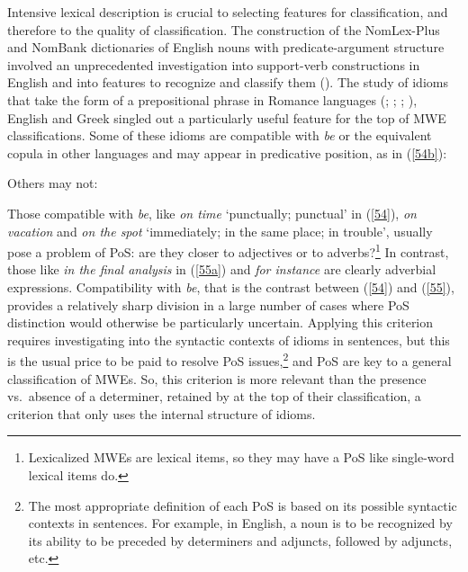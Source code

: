 \documentclass[output=paper]{langsci/langscibook}
\begin{document}
Intensive lexical description is crucial to selecting features for classification, and therefore to the quality of classification. The construction of the NomLex-Plus and NomBank dictionaries of English nouns with predicate-argument structure involved an unprecedented investigation into support-verb constructions in English and into features to recognize and classify them (\citealt{Meyers2007}). The study of idioms that take the form of a prepositional phrase in Romance languages (\citealt{Danlos1980}; \citealt{Ranchhod1990}; \citealt{gross1996}; \citealt{Vietri1996}),  English \citep{Machonis1988} and  Greek \citep{Moustaki1995} singled out a particularly useful feature for the top of MWE classifications. Some of these idioms are compatible with \textit{be} or the equivalent copula in other languages and may appear in predicative position, as in (\ref{54b}):

\begin{exe}
\ex \label{54}
\begin{xlist}
\end{xlist}
\end{exe}

\noindent Others may not:


\begin{exe}
\ex \label{55}
\begin{xlist}
\end{xlist}
\end{exe}


\noindent Those compatible with \textit{be}, like \textit{on time} ‘punctually; punctual’ in (\ref{54}), \textit{on vacation} and \textit{on the spot} ‘immediately; in the same place; in trouble’, usually pose a problem of PoS: are they closer to adjectives or to adverbs?\footnote{Lexicalized MWEs are lexical items, so they may have a PoS like single-word lexical items do.} In contrast, those like \textit{in the final analysis} in (\ref{55a}) and \textit{for instance} are clearly adverbial expressions. Compatibility with \textit{be}, that is the contrast between (\ref{54}) and (\ref{55}), provides a relatively sharp division in a large number of cases where PoS distinction would otherwise be particularly uncertain. Applying this criterion requires investigating into the syntactic contexts of idioms in sentences, but this is the usual price to be paid to resolve PoS issues,\footnote{The most appropriate definition of each PoS is based on its possible syntactic contexts in sentences. For example, in English, a noun is to be recognized by its ability to be preceded by determiners and adjuncts, followed by adjuncts, etc.} and PoS are key to a  general classification of MWEs. So, this criterion is more relevant than the presence vs.~absence of a determiner, retained by  \citet[278]{Baldwin2010} at the top of their classification, a criterion that only uses the internal structure of idioms. 
\end{document}

